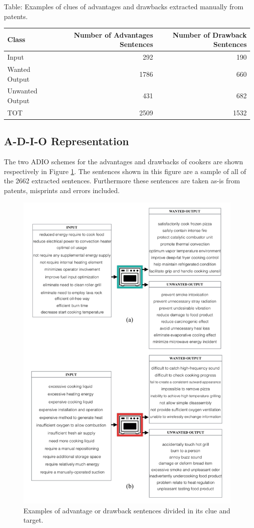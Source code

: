\documentclass[]{book}
\begin{document}
Table: \label{tab:adiotableresults} Examples of clues of advantages and
drawbacks extracted manually from patents.

\begin{tabular}{l|r|r}
\hline
Class & Number of Advantages Sentences & Number of Drawback Sentences\\
\hline
Input & 292 & 190\\
\hline
Wanted Output & 1786 & 660\\
\hline
Unwanted Output & 431 & 682\\
\hline
TOT & 2509 & 1532\\
\hline
\end{tabular}

\subsection{A-D-I-O Representation}\label{a-d-i-o-representation}

The two ADIO schemes for the advantages and drawbacks of cookers are
shown respectively in Figure \ref{fig:adiorapresentationout}. The
sentences shown in this figure are a sample of all of the 2662 extracted
sentences. Furthermore these sentences are taken as-is from patents,
misprints and errors included.

\begin{figure}

{\centering \includegraphics[width=0.8\linewidth]{_bookdown_files/figures/adiorapresentationout} 

}

\caption{Examples of advantage or drawback sentences divided in its clue and target.}\label{fig:adiorapresentationout}
\end{figure}
\end{document}
